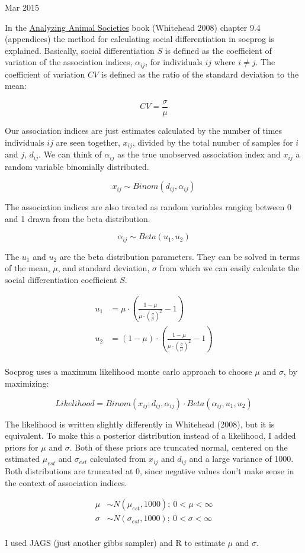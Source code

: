 \documentclass{article}
\begin{document}
 Mar 2015

\vspace*{0.25cm}

In the \underline{Analyzing Animal Societies} book (Whitehead 2008) chapter 9.4 (appendices) the method for calculating social differentiation in socprog is explained. Basically, social differentiation $S$ is defined as the coefficient of variation of the association indices, $\alpha_{ij}$, for individuals $ij$ where $i \ne j$. The coefficient of variation $CV$ is defined as the ratio of the standard deviation to the mean:

\[CV = \frac{\sigma}{\mu}\]

Our association indices are just estimates calculated by the number of times individuals $ij$ are seen together, $x_{ij}$, divided by the total number of samples for $i$ and $j$, $d_{ij}$. We can think of $\alpha_{ij}$ as the true unobserved association index and $x_{ij}$ a random variable binomially distributed.

\[x_{ij} \sim  Binom(d_{ij}, \alpha_{ij})\]

The association indices are also treated as random variables ranging between 0 and 1 drawn from the beta distribution.

\[\alpha_{ij} \sim Beta(u_1,u_2)\]

The $u_1$ and $u_2$ are the beta distribution parameters. They can be solved in terms of the mean, $\mu$, and standard deviation, $\sigma$ from which we can easily calculate the social differentiation coefficient $S$.

\begin{align*}
	u_1 &= \mu \cdot \left(\frac{1-\mu}{\mu \cdot (\frac{\sigma}{\mu})^2} - 1\right) \\
	u_2 &= (1-\mu) \cdot \left(\frac{1-\mu}{\mu \cdot (\frac{\sigma}{\mu})^2} -1\right) \\
\end{align*}

Socprog uses a maximum likelihood monte carlo approach to choose $\mu$ and $\sigma$, by maximizing:

\[Likelihood = Binom(x_{ij}; d_{ij}, \alpha_{ij}) \cdot Beta(\alpha_{ij}, u_1, u_2)\]

The likelihood is written slightly differently in Whitehead (2008), but it is equivalent. To make this a posterior distribution instead of a likelihood, I added priors for $\mu$ and $\sigma$. Both of these priors are truncated normal, centered on the estimated $\mu_{est}$ and $\sigma_{est}$ calculated from $x_{ij}$ and $d_{ij}$ and a large variance of 1000. Both distributions are truncated at 0, since negative values don't make sense in the context of association indices.

\begin{align*}
	\mu &\sim N(\mu_{est}, 1000);~ 0 < \mu < \infty\\
	\sigma &\sim N(\sigma_{est}, 1000); ~ 0 < \sigma < \infty\\
\end{align*}

I used JAGS (just another gibbs sampler) and R to estimate $\mu$ and $\sigma$.
\end{document}
